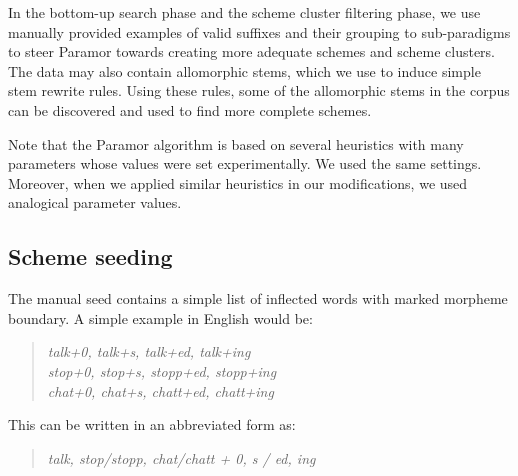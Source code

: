 \documentclass{itatnew}
\newcommand{\e}[1]{\textit{#1}} %
\newcommand{\todoja}[1]{[\textbf{TODOJ} #1]}
\begin{document}
In the bottom-up search phase and the scheme cluster filtering phase, we use manually provided examples of valid suffixes and their grouping to sub-paradigms to steer Paramor towards creating more adequate schemes and scheme clusters. The data may also contain allomorphic stems, which we use to induce simple stem rewrite rules. Using these rules, some of the allomorphic stems in the corpus can be discovered and used to find more complete schemes.

Note that the Paramor algorithm is based on several heuristics with many parameters whose values  were set experimentally. We used the same settings. Moreover, when we applied similar heuristics in our modifications, we used analogical parameter values.



\subsection{Scheme seeding}


\noindent
The manual seed contains a simple list of inflected words with marked morpheme boundary. A simple example in English would be:
\begin{quote}
\e{talk+0, talk+s, talk+ed, talk+ing}\\
\e{stop+0, stop+s, stopp+ed, stopp+ing}\\
\e{chat+0, chat+s, chatt+ed, chatt+ing}
%
\end{quote}

\noindent
This can be written in an abbreviated form as:

\begin{quote}
\e{talk, stop/stopp, chat/chatt +  0, s / ed, ing}
\end{quote}
\end{document}
